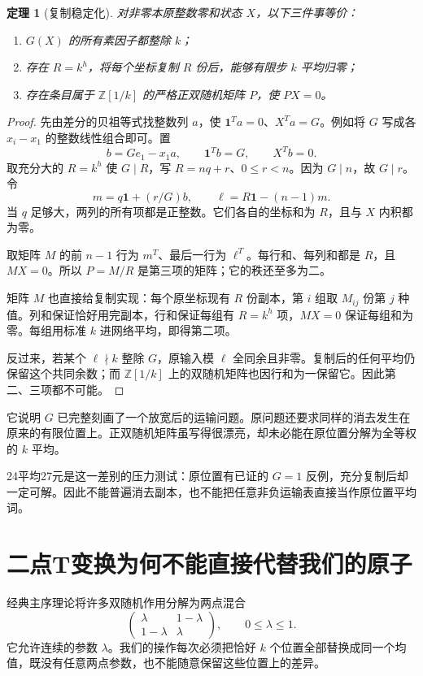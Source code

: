 \documentclass[11pt,a4paper,oneside,openany]{book}
\newcommand{\Z}{\mathbb Z}\newcommand{\Q}{\mathbb Q}\newcommand{\F}{\mathbb F}\newcommand{\CC}{\mathbb C}
\newtheorem{theorem}{定理}[chapter]
\theoremstyle{definition}\newtheorem{example}[theorem]{例}\newtheorem{conjecture}[theorem]{猜想}
\numberwithin{equation}{chapter}\setcounter{tocdepth}{1}
\begin{document}
\begin{theorem}[复制稳定化]
对非零本原整数零和状态 $X$，以下三件事等价：
\begin{enumerate}
\item $G(X)$ 的所有素因子都整除 $k$；
\item 存在 $R=k^h$，将每个坐标复制 $R$ 份后，能够有限步 $k$ 平均归零；
\item 存在条目属于 $\Z[1/k]$ 的严格正双随机矩阵 $P$，使 $PX=0$。
\end{enumerate}
\end{theorem}
\begin{proof}
先由差分的贝祖等式找整数列 $a$，使 $\mathbf1^Ta=0$、$X^Ta=G$。例如将 $G$ 写成各 $x_i-x_1$ 的整数线性组合即可。置
\[b=Ge_1-x_1a,
\qquad\mathbf1^Tb=G,\qquad X^Tb=0.
\]
取充分大的 $R=k^h$ 使 $G\mid R$，写 $R=nq+r$、$0\le r<n$。因为 $G\mid n$，故 $G\mid r$。令
\[m=q\mathbf1+(r/G)b,\qquad
\ell=R\mathbf1-(n-1)m.
\]
当 $q$ 足够大，两列的所有项都是正整数。它们各自的坐标和为 $R$，且与 $X$ 内积都为零。

取矩阵 $M$ 的前 $n-1$ 行为 $m^T$、最后一行为 $\ell^T$。每行和、每列和都是 $R$，且 $MX=0$。所以 $P=M/R$ 是第三项的矩阵；它的秩还至多为二。

矩阵 $M$ 也直接给复制实现：每个原坐标现有 $R$ 份副本，第 $i$ 组取 $M_{ij}$ 份第 $j$ 种值。列和保证恰好用完副本，行和保证每组有 $R=k^h$ 项，$MX=0$ 保证每组和为零。每组用标准 $k$ 进网络平均，即得第二项。

反过来，若某个 $\ell\nmid k$ 整除 $G$，原输入模 $\ell$ 全同余且非零。复制后的任何平均仍保留这个共同余数；而 $\Z[1/k]$ 上的双随机矩阵也因行和为一保留它。因此第二、三项都不可能。
\end{proof}

它说明 $G$ 已完整刻画了一个放宽后的运输问题。原问题还要求同样的消去发生在原来的有限位置上。正双随机矩阵虽写得很漂亮，却未必能在原位置分解为全等权的 $k$ 平均。

24平均27元是这一差别的压力测试：原位置有已证的 $G=1$ 反例，充分复制后却一定可解。因此不能普遍消去副本，也不能把任意非负运输表直接当作原位置平均词。

\section{二点T变换为何不能直接代替我们的原子}
经典主序理论将许多双随机作用分解为两点混合
\[\begin{pmatrix}\lambda&1-\lambda\\1-\lambda&\lambda\end{pmatrix},
\qquad0\le\lambda\le1.
\]
它允许连续的参数 $\lambda$。我们的操作每次必须把恰好 $k$ 个位置全部替换成同一个均值，既没有任意两点参数，也不能随意保留这些位置上的差异。
\end{document}
